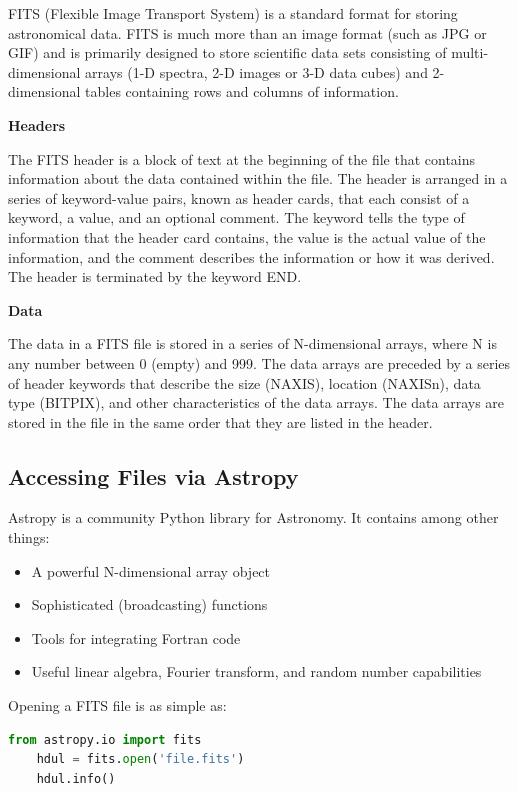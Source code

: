 \documentclass[11pt]{book} %
\begin{document}
FITS (Flexible Image Transport System) is a standard format for storing astronomical data. FITS is much more than an image format (such as JPG or GIF) and is primarily designed to store scientific data sets consisting of multi-dimensional arrays (1-D spectra, 2-D images or 3-D data cubes) and 2-dimensional tables containing rows and columns of information.

\noindent\textbf{Headers}

The FITS header is a block of text at the beginning of the file that contains information about the data contained within the file. The header is arranged in a series of keyword-value pairs, known as header cards, that each consist of a keyword, a value, and an optional comment. The keyword tells the type of information that the header card contains, the value is the actual value of the information, and the comment describes the information or how it was derived. The header is terminated by the keyword END.

\noindent\textbf{Data}

The data in a FITS file is stored in a series of N-dimensional arrays, where N is any number between 0 (empty) and 999. The data arrays are preceded by a series of header keywords that describe the size (NAXIS), location (NAXISn), data type (BITPIX), and other characteristics of the data arrays. The data arrays are stored in the file in the same order that they are listed in the header.

\subsection{Accessing Files via Astropy}

Astropy is a community Python library for Astronomy. It contains among other things:

\begin{itemize}
    \item A powerful N-dimensional array object
    \item Sophisticated (broadcasting) functions
    \item Tools for integrating Fortran code
    \item Useful linear algebra, Fourier transform, and random number capabilities
\end{itemize}

Opening a FITS file is as simple as:

\begin{lstlisting}[language=Python]
    from astropy.io import fits
    hdul = fits.open('file.fits')
    hdul.info()
\end{lstlisting}
\end{document}

